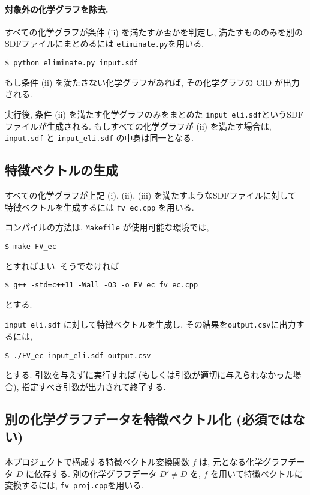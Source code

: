 \documentclass[11pt, titlepage, dvipdfmx, twoside]{jarticle}
\begin{document}
\paragraph{対象外の化学グラフを除去.}
すべての化学グラフが条件 (ii) を満たすか否かを判定し,
満たすもののみを別のSDFファイルにまとめるには
{\tt eliminate.py}を用いる.

\begin{oframed}
{\small
\verb|$ python eliminate.py input.sdf|
}
\end{oframed}

もし条件 (ii) を満たさない化学グラフがあれば, その化学グラフの CID が出力される.

実行後, 条件 (ii) を満たす化学グラフのみをまとめた
{\tt input\_eli.sdf}というSDFファイルが生成される.
もしすべての化学グラフが (ii) を満たす場合は,
{\tt input.sdf} と {\tt input\_eli.sdf} の中身は同一となる. 


\subsection{特徴ベクトルの生成}
すべての化学グラフが上記 (i), (ii), (iii) を満たすようなSDFファイルに対して
特徴ベクトルを生成するには {\tt fv\_ec.cpp} を用いる.

コンパイルの方法は, {\tt Makefile} が使用可能な環境では, 
\begin{oframed}
{\small
\verb|$ make FV_ec|
}
\end{oframed}
とすればよい. そうでなければ
\begin{oframed}
{\small
\verb|$ g++ -std=c++11 -Wall -O3 -o FV_ec fv_ec.cpp|
}
\end{oframed}
とする.

{\tt input\_eli.sdf} に対して特徴ベクトルを生成し,
その結果を{\tt output.csv}に出力するには,
\begin{oframed}
{\small
\verb|$ ./FV_ec input_eli.sdf output.csv|
}
\end{oframed}
とする. 
引数を与えずに実行すれば (もしくは引数が適切に与えられなかった場合), 
指定すべき引数が出力されて終了する. 

\subsection{別の化学グラフデータを特徴ベクトル化 (必須ではない)}

本プロジェクトで構成する特徴ベクトル変換関数 $f$ は,
元となる化学グラフデータ $D$ に依存する.
別の化学グラフデータ $D'\ne D$ を,
$f$ を用いて特徴ベクトルに変換するには,
{\tt fv\_proj.cpp}を用いる. 
\end{document}
